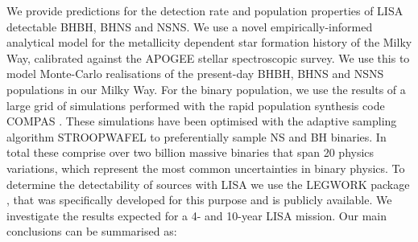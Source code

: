 We provide predictions for the detection rate and population properties of LISA detectable BHBH, BHNS and NSNS.
%
We use a novel empirically-informed analytical model for the metallicity dependent star formation history of the Milky Way, calibrated against the APOGEE stellar spectroscopic survey. We use this to model Monte-Carlo realisations of the present-day BHBH, BHNS and NSNS populations in our Milky Way. 
%
For the binary population, we use the results of a large grid of simulations performed with the rapid population synthesis code COMPAS \citefloorp{}. These simulations have been optimised with the adaptive sampling algorithm STROOPWAFEL to preferentially sample NS and BH binaries. In total these comprise over two billion massive binaries that span 20 physics variations, which represent the most common uncertainties in binary physics.
%
To determine the detectability of sources with LISA we use the LEGWORK package \citep{Wagg+2021}, that was specifically developed for this purpose and is publicly available. 
%
We investigate the results expected for a 4- and 10-year LISA mission. Our main conclusions can be summarised as:
